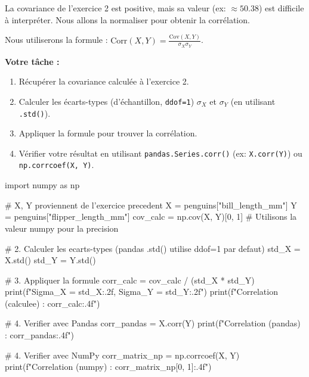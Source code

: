 \begin{exercicebox}
La covariance de l'exercice 2 est positive, mais sa valeur (ex: $\approx 50.38$) est difficile à interpréter. Nous allons la normaliser pour obtenir la corrélation.

Nous utiliserons la formule : $\text{Corr}(X,Y) = \frac{\text{Cov}(X,Y)}{\sigma_X \sigma_Y}$.

\textbf{Votre tâche :}
\begin{enumerate}
    \item Récupérer la covariance calculée à l'exercice 2.
    \item Calculer les écarts-types (d'échantillon, \texttt{ddof=1}) $\sigma_X$ et $\sigma_Y$ (en utilisant \texttt{.std()}).
    \item Appliquer la formule pour trouver la corrélation.
    \item Vérifier votre résultat en utilisant \texttt{pandas.Series.corr()} (ex: \texttt{X.corr(Y)}) ou \texttt{np.corrcoef(X, Y)}.
\end{enumerate}

\begin{codecell}
import numpy as np

# X, Y proviennent de l'exercice precedent
X = penguins["bill_length_mm"]
Y = penguins["flipper_length_mm"]
cov_calc = np.cov(X, Y)[0, 1] # Utilisons la valeur numpy pour la precision

# 2. Calculer les ecarts-types (pandas .std() utilise ddof=1 par defaut)
std_X = X.std()
std_Y = Y.std()

# 3. Appliquer la formule
corr_calc = cov_calc / (std_X * std_Y)
print(f"Sigma_X = {std_X:.2f}, Sigma_Y = {std_Y:.2f}")
print(f"Correlation (calculee) : {corr_calc:.4f}")

# 4. Verifier avec Pandas
corr_pandas = X.corr(Y)
print(f"Correlation (pandas)   : {corr_pandas:.4f}")

# 4. Verifier avec NumPy
corr_matrix_np = np.corrcoef(X, Y)
print(f"Correlation (numpy)    : {corr_matrix_np[0, 1]:.4f}")
\end{codecell}
\end{exercicebox}

